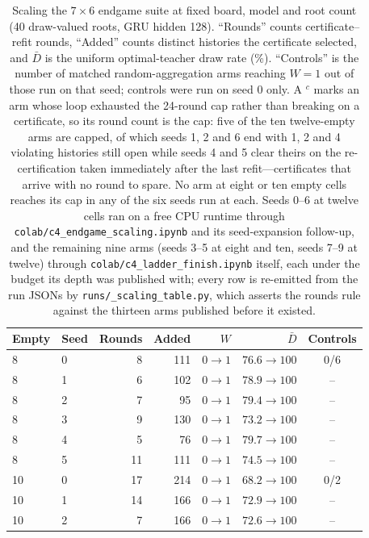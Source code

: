 \documentclass[conference]{IEEEtran}
\begin{document}
\begin{table}[t]
\centering
\caption{Scaling the $7\times6$ endgame suite at fixed board, model and root count (40 draw-valued roots, GRU hidden 128). ``Rounds'' counts certificate--refit rounds, ``Added'' counts distinct histories the certificate selected, and $\bar D$ is the uniform optimal-teacher draw rate (\%). ``Controls'' is the number of matched random-aggregation arms reaching $W=1$ out of those run on that seed; controls were run on seed 0 only. A $^{c}$ marks an arm whose loop exhausted the 24-round cap rather than breaking on a certificate, so its round count is the cap: five of the ten twelve-empty arms are capped, of which seeds 1, 2 and 6 end with 1, 2 and 4 violating histories still open while seeds 4 and 5 clear theirs on the re-certification taken immediately after the last refit---certificates that arrive with no round to spare. No arm at eight or ten empty cells reaches its cap in any of the six seeds run at each. Seeds 0--6 at twelve cells ran on a free CPU runtime through \texttt{colab/c4\_endgame\_scaling.ipynb} and its seed-expansion follow-up, and the remaining nine arms (seeds 3--5 at eight and ten, seeds 7--9 at twelve) through \texttt{colab/c4\_ladder\_finish.ipynb} itself, each under the budget its depth was published with; every row is re-emitted from the run JSONs by \texttt{runs/\allowbreak\_scaling\_table.py}, which asserts the rounds rule against the thirteen arms published before it existed.}
\label{tab:scaling76}
\setlength{\tabcolsep}{4pt}
\footnotesize
\begin{tabular}{@{}llrrrrc@{}}
\toprule
\textbf{Empty} & \textbf{Seed} & \textbf{Rounds} & \textbf{Added} & \textbf{$W$} & \textbf{$\bar D$} & \textbf{Controls} \\
\midrule
8  & 0 & 8 & 111 & $0\to1$ & $76.6\to100$ & 0/6 \\
8  & 1 & 6 & 102 & $0\to1$ & $78.9\to100$ & -- \\
8  & 2 & 7 & 95  & $0\to1$ & $79.4\to100$ & -- \\
8  & 3 & 9 & 130 & $0\to1$ & $73.2\to100$ & -- \\
8  & 4 & 5 & 76  & $0\to1$ & $79.7\to100$ & -- \\
8  & 5 & 11 & 111 & $0\to1$ & $74.5\to100$ & -- \\
\midrule
10 & 0 & 17 & 214 & $0\to1$ & $68.2\to100$ & 0/2 \\
10 & 1 & 14 & 166 & $0\to1$ & $72.9\to100$ & -- \\
10 & 2 & 7  & 166 & $0\to1$ & $72.6\to100$ & -- \\

\end{tabular}
\end{table}
\end{document}
